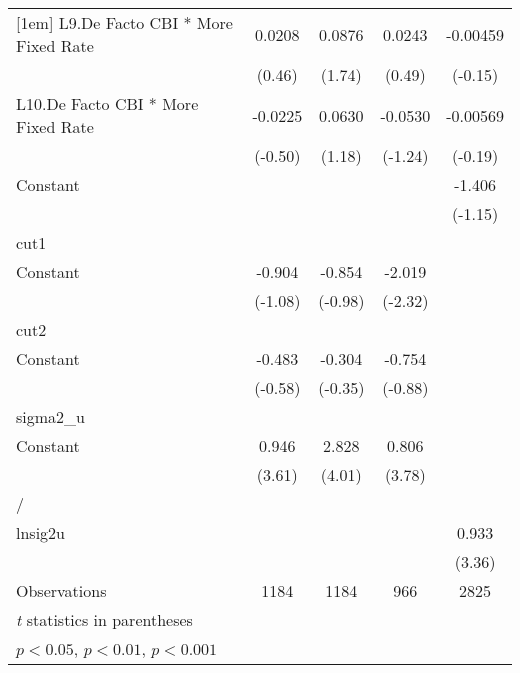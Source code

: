 {\begin{longtable}{l*{4}{c}}
[1em]
L9.De Facto CBI * More Fixed Rate&   0.0208         &   0.0876         &   0.0243         & -0.00459         \\
                &   (0.46)         &   (1.74)         &   (0.49)         &  (-0.15)         \\
[1em]
L10.De Facto CBI * More Fixed Rate&  -0.0225         &   0.0630         &  -0.0530         & -0.00569         \\
                &  (-0.50)         &   (1.18)         &  (-1.24)         &  (-0.19)         \\
[1em]
Constant        &                  &                  &                  &   -1.406         \\
                &                  &                  &                  &  (-1.15)         \\
\hline
cut1            &                  &                  &                  &                  \\
Constant        &   -0.904         &   -0.854         &   -2.019\sym{*}  &                  \\
                &  (-1.08)         &  (-0.98)         &  (-2.32)         &                  \\
\hline
cut2            &                  &                  &                  &                  \\
Constant        &   -0.483         &   -0.304         &   -0.754         &                  \\
                &  (-0.58)         &  (-0.35)         &  (-0.88)         &                  \\
\hline
sigma2\_u        &                  &                  &                  &                  \\
Constant        &    0.946\sym{***}&    2.828\sym{***}&    0.806\sym{***}&                  \\
                &   (3.61)         &   (4.01)         &   (3.78)         &                  \\
\hline
/               &                  &                  &                  &                  \\
lnsig2u         &                  &                  &                  &    0.933\sym{***}\\
                &                  &                  &                  &   (3.36)         \\
\hline
Observations    &     1184         &     1184         &      966         &     2825         \\
\hline\hline
\multicolumn{5}{l}{\footnotesize \textit{t} statistics in parentheses}\\
\multicolumn{5}{l}{\footnotesize \sym{*} \(p<0.05\), \sym{**} \(p<0.01\), \sym{***} \(p<0.001\)}\\
\end{longtable}
}
